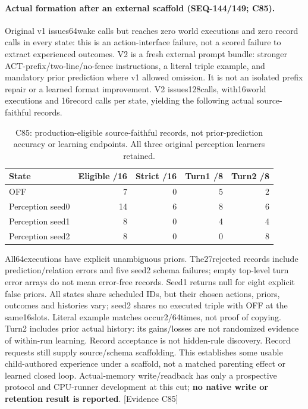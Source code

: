 \documentclass{article}
\begin{document}
\paragraph{Actual formation after an external scaffold (SEQ-144/149; C85).}
Original v1 issues64wake calls but reaches zero world executions and zero record
calls in every state: this is an action-interface failure, not a scored failure
to extract experienced outcomes. V2 is a fresh external prompt bundle: stronger
ACT-prefix/two-line/no-fence instructions, a literal triple example, and mandatory
prior prediction where v1 allowed omission. It is not an isolated prefix repair
or a learned format improvement. V2 issues128calls, with16world executions and
16record calls per state, yielding the following actual source-faithful records.
\begin{table}[htbp]
\centering\small
\begin{tabular}{lrrrr}
\toprule
State & Eligible /16 & Strict /16 & Turn1 /8 & Turn2 /8 \\
\midrule
OFF & 7 & 0 & 5 & 2 \\
Perception seed0 & 14 & 6 & 8 & 6 \\
Perception seed1 & 8 & 0 & 4 & 4 \\
Perception seed2 & 8 & 0 & 0 & 8 \\
\bottomrule
\end{tabular}
\caption{C85: production-eligible source-faithful records, not prior-prediction
accuracy or learning endpoints. All three original perception learners retained.}
\label{tab:seq149-formation}
\end{table}
All64executions have explicit unambiguous priors. The27rejected records include
prediction/relation errors and five seed2 schema failures; empty top-level turn
error arrays do not mean error-free records. Seed1 returns null for eight explicit
false priors. All states share scheduled IDs, but their chosen actions, priors,
outcomes and histories vary; seed2 shares no executed triple with OFF at the
same16slots. Literal example matches occur2/64times, not proof of copying.
Turn2 includes prior actual history: its gains/losses are not randomized evidence
of within-run learning. Record acceptance is not hidden-rule discovery. Record requests still supply source/schema scaffolding. This
establishes some usable child-authored experience under a scaffold, not a
matched parenting effect or learned closed loop. Actual-memory write/readback
has only a prospective protocol and CPU-runner development at this cut;
\textbf{no native write or retention result is reported}. \textsf{[Evidence C85]}
\end{document}
